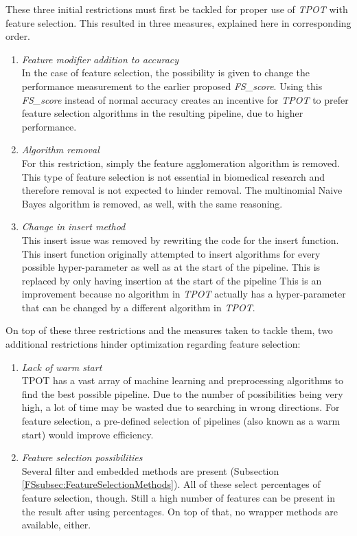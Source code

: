 \documentclass[10pt,a4paper]{report}
\begin{document}
	These three initial restrictions must first be tackled for proper use of \textit{TPOT} with feature selection. This resulted in three measures, explained here in corresponding order.
	
	\begin{enumerate}
		\item \textit{Feature modifier addition to accuracy} \\
		In the case of feature selection, the possibility is given to change the performance measurement to the earlier proposed \textit{FS\_score}. Using this \textit{FS\_score} instead of normal accuracy creates an incentive for \textit{TPOT} to prefer feature selection algorithms in the resulting pipeline, due to higher performance.
		\item \textit{Algorithm removal} \\
		For this restriction, simply the feature agglomeration algorithm is removed. This type of feature selection is not essential in biomedical research and therefore removal is not expected to hinder removal. The multinomial Naive Bayes algorithm is removed, as well, with the same reasoning.
		\item \textit{Change in insert method} \\
		This insert issue was removed by rewriting the code for the insert function. This insert function originally attempted to insert algorithms for every possible hyper-parameter as well as at the start of the pipeline. This is replaced by only having insertion at the start of the pipeline This is an improvement because no algorithm in \textit{TPOT} actually has a hyper-parameter that can be changed by a different algorithm in \textit{TPOT}.
	\end{enumerate}
	
	On top of these three restrictions and the measures taken to tackle them, two additional restrictions hinder optimization regarding feature selection:
	
	\begin{enumerate}
		\item \textit{Lack of warm start} \\
		TPOT has a vast array of machine learning and preprocessing algorithms to find the best possible pipeline. Due to the number of possibilities being very high, a lot of time may be wasted due to searching in wrong directions. For feature selection, a pre-defined selection of pipelines (also known as a warm start) would improve efficiency.
		\item \textit{Feature selection possibilities} \\
		Several filter and embedded methods are present (Subsection \ref{FSsubsec:FeatureSelectionMethods}). All of these select percentages of feature selection, though. Still a high number of features can be present in the result after using percentages. On top of that, no wrapper methods are available, either.
	\end{enumerate}
	
\end{document}

